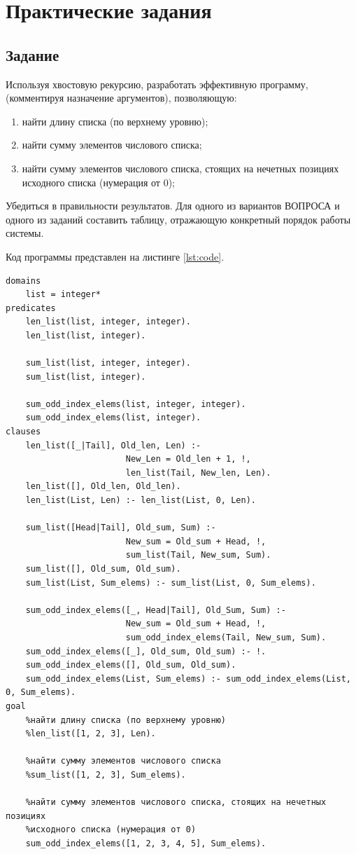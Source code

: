 \chapter{Практические задания}
\section{Задание}
\vspace{-0.7cm}
Используя хвостовую рекурсию, разработать эффективную программу,
(комментируя назначение аргументов), позволяющую:
\begin{enumerate}
	\item найти длину списка (по верхнему уровню);
	\item найти сумму элементов числового списка;
	\item найти сумму элементов числового списка, стоящих на нечетных позициях
	исходного списка (нумерация от 0);
\end{enumerate}
Убедиться в правильности результатов. Для одного из вариантов ВОПРОСА и одного из заданий составить таблицу,
отражающую конкретный порядок работы системы.

Код программы представлен на листинге \ref{lst:code}.
\newpage
\begin{lstlisting}[label=lst:code, basicstyle=\footnotesize, caption=Код программы]
domains
	list = integer*
predicates
	len_list(list, integer, integer).
	len_list(list, integer).
	
	sum_list(list, integer, integer).
	sum_list(list, integer).
	
	sum_odd_index_elems(list, integer, integer).
	sum_odd_index_elems(list, integer).
clauses
	len_list([_|Tail], Old_len, Len) :- 
						New_Len = Old_len + 1, !,
						len_list(Tail, New_len, Len).
	len_list([], Old_len, Old_len). 
	len_list(List, Len) :- len_list(List, 0, Len).
	
	sum_list([Head|Tail], Old_sum, Sum) :- 
						New_sum = Old_sum + Head, !,
						sum_list(Tail, New_sum, Sum).
	sum_list([], Old_sum, Old_sum).
	sum_list(List, Sum_elems) :- sum_list(List, 0, Sum_elems).
	
	sum_odd_index_elems([_, Head|Tail], Old_Sum, Sum) :- 
						New_sum = Old_sum + Head, !,
						sum_odd_index_elems(Tail, New_sum, Sum).
	sum_odd_index_elems([_], Old_sum, Old_sum) :- !.   							
	sum_odd_index_elems([], Old_sum, Old_sum).
	sum_odd_index_elems(List, Sum_elems) :- sum_odd_index_elems(List, 0, Sum_elems).
goal
	%найти длину списка (по верхнему уровню)
	%len_list([1, 2, 3], Len).
	
	%найти сумму элементов числового списка
	%sum_list([1, 2, 3], Sum_elems).
	
	%найти сумму элементов числового списка, стоящих на нечетных позициях
	%исходного списка (нумерация от 0)
	sum_odd_index_elems([1, 2, 3, 4, 5], Sum_elems).
\end{lstlisting}

